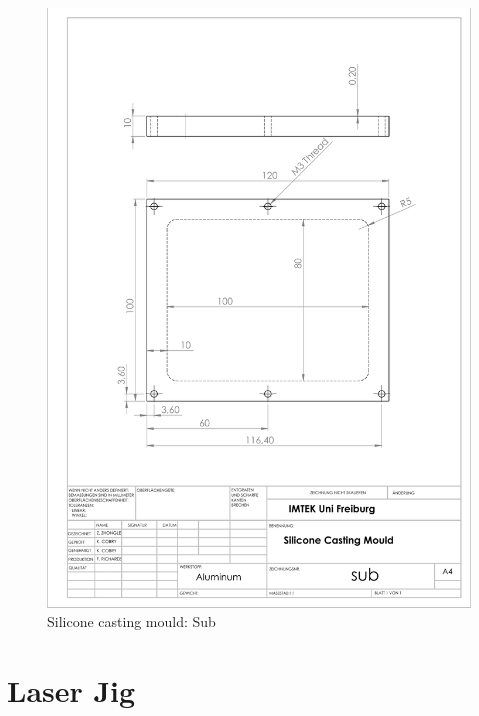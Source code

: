 \begin{figure}[h]%
\centering
\includegraphics[width=1\textwidth]{figures/appendix/siliconecastingmouldsub}%
\caption{Silicone casting mould: Sub}%
\label{siliconecastingmouldsub}%
\end{figure}

\clearpage

\section{Laser Jig}

